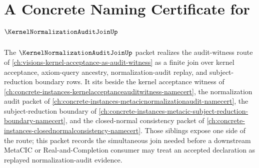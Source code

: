 \chapter{A Concrete Naming Certificate for $\KernelNormalizationAuditJoinUp$}
\label{ch:concrete-instances-kernel-normalization-audit-join-namecert}

The $\KernelNormalizationAuditJoinUp$ packet realizes the audit-witness route of \autoref{ch:visions-kernel-acceptance-as-audit-witness} as a finite join over kernel acceptance, axiom-query ancestry, normalization-audit replay, and subject-reduction boundary rows. It sits beside the kernel acceptance witness of \autoref{ch:concrete-instances-kernelacceptanceauditwitness-namecert}, the normalization audit packet of \autoref{ch:concrete-instances-metacicnormalizationaudit-namecert}, the subject-reduction boundary of \autoref{ch:concrete-instances-metacic-subject-reduction-boundary-namecert}, and the closed-normal consistency packet of \autoref{ch:concrete-instances-closednormalconsistency-namecert}. Those siblings expose one side of the route; this packet records the simultaneous join needed before a downstream MetaCIC or Real-and-Completion consumer may treat an accepted declaration as replayed normalization-audit evidence.

